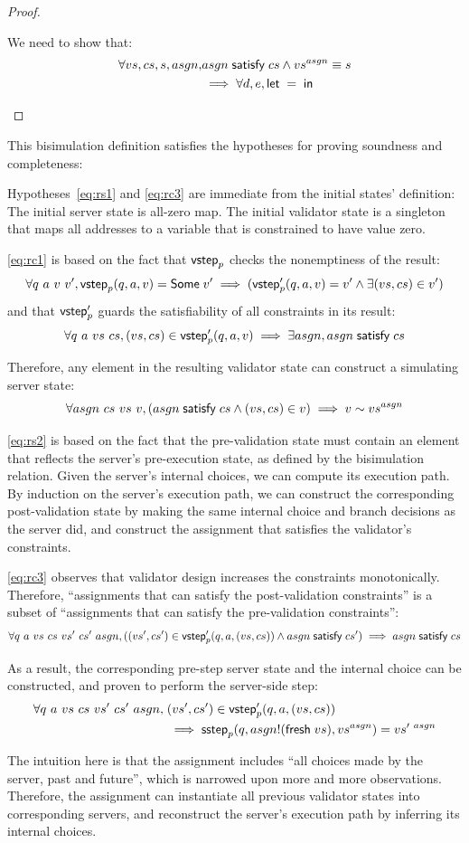 \begin{proof}
\begin{enumerate}
We need to show that:
\begin{align*}
\forall vs,cs,s,asgn,&asgn\;\mathsf{satisfy}\;cs\wedge vs^{asgn}\equiv s\\
&\implies\forall d,e,\mathsf{let}\;=\;\mathsf{in}\;
\end{align*}
\end{enumerate}

\end{proof}

This bisimulation definition satisfies the hypotheses for proving soundness and
completeness:

Hypotheses~\ref{eq:rs1} and \ref{eq:rc3} are immediate from the initial states'
definition: The initial server state is all-zero map.  The initial validator
state is a singleton that maps all addresses to a variable that is constrained
to have value zero.

\autoref{eq:rc1} is based on the fact that $\mathsf{vstep}_p$ checks the nonemptiness of
the result:
\[\forall q~a~v~v',\mathsf{vstep}_p(q,a,v)=\mathsf{Some}\;v'\implies(\mathsf{vstep}_p'(q,a,v)=v'\wedge\exists (vs,cs)\in v')\]
and that $\mathsf{vstep}_p'$ guards the satisfiability of all constraints in its result:
\[\forall q~a~vs~cs,{(vs,cs)}\in\mathsf{vstep}_p'(q,a,v)\implies\exists asgn,asgn\;\mathsf{satisfy}\;cs\]

Therefore, any element in the resulting validator state can construct a
simulating server state:
\[\forall asgn~cs~vs~v,(asgn\;\mathsf{satisfy}\;cs\wedge(vs,cs)\in v)\implies v\sim vs^{asgn}\]

\autoref{eq:rs2} is based on the fact that the pre-validation state must contain
an element that reflects the server's pre-execution state, as defined by the
bisimulation relation.  Given the server's internal choices, we can compute its
execution path.  By induction on the server's execution path, we can construct
the corresponding post-validation state by making the same internal choice and
branch decisions as the server did, and construct the assignment that satisfies
the validator's constraints.

\autoref{eq:rc3} observes that validator design increases the constraints
monotonically.  Therefore, ``assignments that can satisfy the post-validation
constraints'' is a subset of ``assignments that can satisfy the pre-validation
constraints'':
\[\forall q~a~vs~cs~vs'~cs'~asgn,((vs',cs')\in\mathsf{vstep}_p'(q,a,(vs,cs))\wedge asgn\;\mathsf{satisfy}\;cs')\implies asgn\;\mathsf{satisfy}\;cs\]

As a result, the corresponding pre-step server state and the internal choice can
be constructed, and proven to perform the server-side step:
\begin{align*}
\forall q~a~vs~cs~vs'~cs'~asgn,\;&(vs',cs')\in\mathsf{vstep}_p'(q,a,(vs,cs))\\
&\implies\mathsf{sstep}_p(q,asgn!(\mathsf{fresh}\;{vs}),vs^{asgn})=vs'^{~asgn}
\end{align*}

The intuition here is that the assignment includes ``all choices made by the
server, past and future'', which is narrowed upon more and more observations.
Therefore, the assignment can instantiate all previous validator states into
corresponding servers, and reconstruct the server's execution path by inferring
its internal choices.
